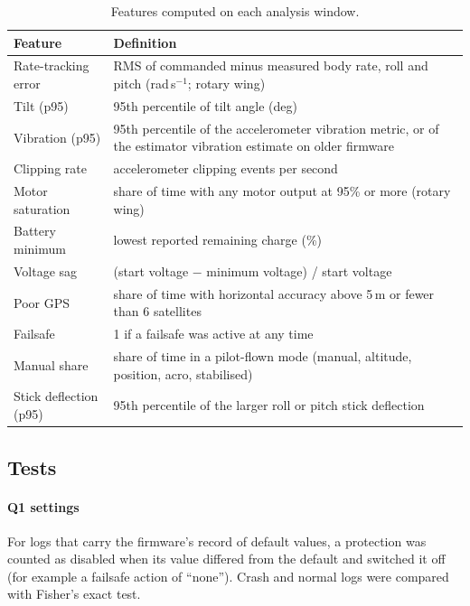 \documentclass[preprint,12pt]{elsarticle}
\begin{document}
\begin{table}[t]
\centering
\caption{Features computed on each analysis window.}
\label{tab:features}
\small
\begin{tabularx}{\textwidth}{@{}lY@{}}
\toprule
Feature & Definition \\
\midrule
Rate-tracking error & RMS of commanded minus measured body rate, roll and pitch (rad\,s$^{-1}$; rotary wing) \\
Tilt (p95) & 95th percentile of tilt angle (deg) \\
Vibration (p95) & 95th percentile of the accelerometer vibration metric, or of the estimator vibration estimate on older firmware \\
Clipping rate & accelerometer clipping events per second \\
Motor saturation & share of time with any motor output at 95\% or more (rotary wing) \\
Battery minimum & lowest reported remaining charge (\%) \\
Voltage sag & (start voltage $-$ minimum voltage) / start voltage \\
Poor GPS & share of time with horizontal accuracy above 5\,m or fewer than 6 satellites \\
Failsafe & 1 if a failsafe was active at any time \\
Manual share & share of time in a pilot-flown mode (manual, altitude, position, acro, stabilised) \\
Stick deflection (p95) & 95th percentile of the larger roll or pitch stick deflection \\
\bottomrule
\end{tabularx}
\end{table}

\subsection{Tests}
\paragraph{Q1 settings} For logs that carry the firmware's record of default values, a protection was counted as
disabled when its value differed from the default and switched it off (for example a failsafe action of ``none'').
Crash and normal logs were compared with Fisher's exact test.
\end{document}
